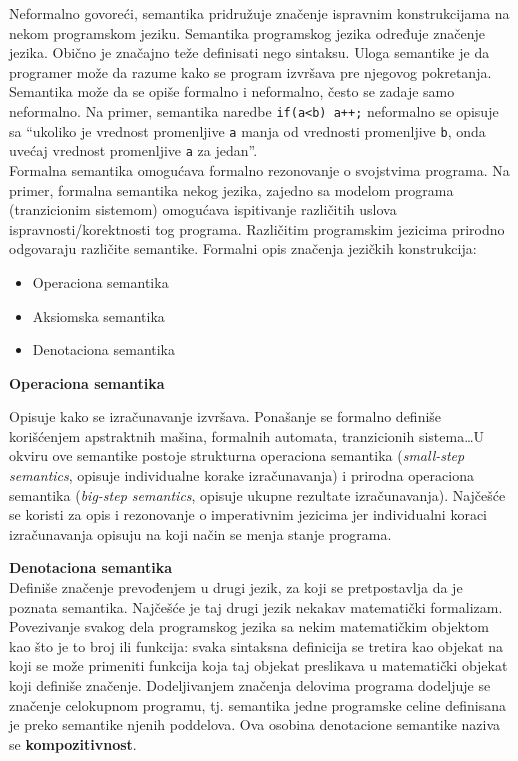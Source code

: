 \documentclass[../main.tex]{subfiles}
\begin{document}
Neformalno govoreći, semantika pridružuje značenje ispravnim konstrukcijama na nekom programskom jeziku. Semantika programskog jezika određuje značenje jezika. Obično je značajno teže definisati nego sintaksu. Uloga semantike je da programer može da razume kako se program izvršava pre njegovog pokretanja. Semantika može da se opiše formalno i neformalno, često se zadaje samo neformalno. Na primer, semantika naredbe \texttt{if(a<b) a++;} neformalno se opisuje sa ``ukoliko je vrednost promenljive 
\texttt{a} manja od vrednosti promenljive \texttt{b}, onda uvećaj vrednost promenljive \texttt{a} za jedan''.
\\
Formalna semantika omogućava formalno rezonovanje o svojstvima programa. Na primer, formalna semantika nekog jezika, zajedno sa modelom programa (tranzicionim sistemom) omogućava ispitivanje različitih uslova ispravnosti/korektnosti tog programa. Različitim programskim jezicima prirodno odgovaraju različite semantike.
Formalni opis značenja jezičkih konstrukcija: 
\begin{itemize}
\item Operaciona semantika
\item Aksiomska semantika
\item Denotaciona semantika
\end{itemize}

{\bf Operaciona semantika} \hfill

	Opisuje kako se izračunavanje izvršava. Ponašanje se formalno definiše korišćenjem apstraktnih mašina, formalnih automata, tranzicionih sistema\ldots U okviru ove semantike postoje {\color{red} strukturna operaciona semantika} ({\it small-step semantics}, opisuje individualne korake izračunavanja) i {\color{red}prirodna operaciona semantika} ({\it big-step semantics}, opisuje ukupne rezultate izračunavanja). Najčešće se koristi za opis i rezonovanje o imperativnim jezicima jer individualni koraci izračunavanja opisuju na koji način se menja stanje programa.

{\bf Denotaciona semantika} \\
	Definiše značenje prevođenjem u drugi jezik, za koji se pretpostavlja da je poznata semantika. Najčešće je taj drugi jezik nekakav matematički formalizam. Povezivanje svakog dela programskog jezika sa nekim matematičkim objektom kao što je to broj ili funkcija: svaka sintaksna definicija se tretira kao objekat na koji se može primeniti funkcija koja taj objekat preslikava u matematički objekat koji definiše značenje. Dodeljivanjem značenja delovima programa dodeljuje se značenje celokupnom programu, tj. semantika jedne programske celine definisana je preko semantike njenih poddelova. Ova osobina denotacione semantike naziva se {\bf kompozitivnost}. 
\end{document}
